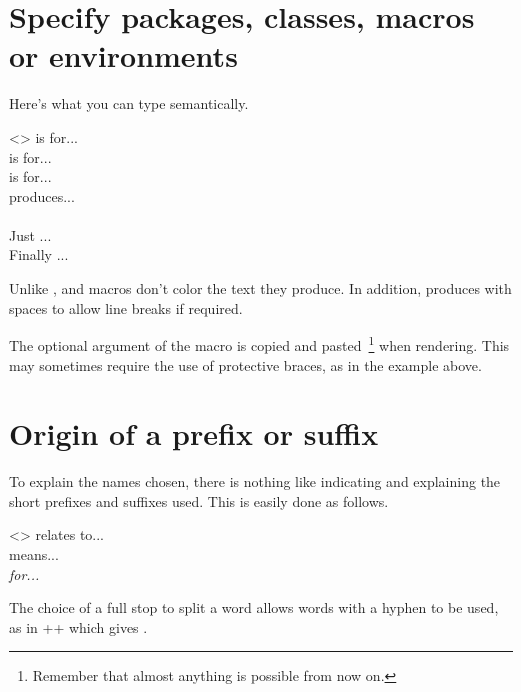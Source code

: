\documentclass{tutodoc}
\begin{document}
\section{Specify packages, classes, macros or environments}

Here's what you can type semantically.


\begin{tdoclatex}<>
 is for...              \\
 is for...           \\
 is for...           \\
 produces...                \\
            \\
Just ...                   \\
Finally ...
\end{tdoclatex}


\begin{tdocrem}
    Unlike ,  and  macros don't color the text they produce.
    In addition,  produces  with spaces to allow line breaks if required.
\end{tdocrem}


\begin{tdocwarn}
    The optional argument of the  macro is copied and pasted\,%
    \footnote{
        Remember that almost anything is possible from now on.
    }
    when rendering. This may sometimes require the use of protective braces, as in the example above.
\end{tdocwarn}



\section{Origin of a prefix or suffix}

To explain the names chosen, there is nothing like indicating and explaining the short prefixes and suffixes used. This is easily done as follows.


\begin{tdoclatex}<>
 relates to...      \\
 means...   \\
\emph{ for...}
\end{tdoclatex}


\begin{tdocrem}
    The choice of a full stop to split a word allows words with a hyphen to be used, as in \tdoclatexin++ which gives .
\end{tdocrem}
\end{document}
